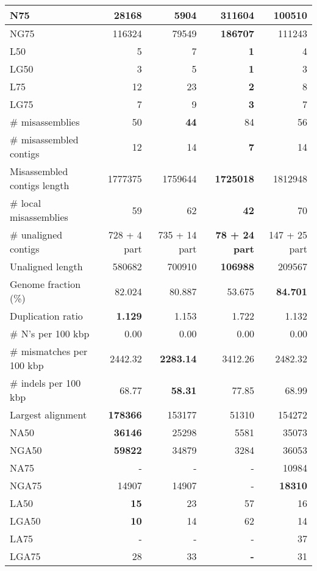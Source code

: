 \documentclass[12pt,a4paper]{article}
\begin{document}
\begin{table}[ht]
\begin{center}
\begin{tabular}{|l*{4}{|r}|}
N75 & 28168 & 5904 & {\bf 311604} & 100510 \\ \hline
NG75 & 116324 & 79549 & {\bf 186707} & 111243 \\ \hline
L50 & 5 & 7 & {\bf 1} & 4 \\ \hline
LG50 & 3 & 5 & {\bf 1} & 3 \\ \hline
L75 & 12 & 23 & {\bf 2} & 8 \\ \hline
LG75 & 7 & 9 & {\bf 3} & 7 \\ \hline
\# misassemblies & 50 & {\bf 44} & 84 & 56 \\ \hline
\# misassembled contigs & 12 & 14 & {\bf 7} & 14 \\ \hline
Misassembled contigs length & 1777375 & 1759644 & {\bf 1725018} & 1812948 \\ \hline
\# local misassemblies & 59 & 62 & {\bf 42} & 70 \\ \hline
\# unaligned contigs & 728 + 4 part & 735 + 14 part & {\bf 78 + 24 part} & 147 + 25 part \\ \hline
Unaligned length & 580682 & 700910 & {\bf 106988} & 209567 \\ \hline
Genome fraction (\%) & 82.024 & 80.887 & 53.675 & {\bf 84.701} \\ \hline
Duplication ratio & {\bf 1.129} & 1.153 & 1.722 & 1.132 \\ \hline
\# N's per 100 kbp & 0.00 & 0.00 & 0.00 & 0.00 \\ \hline
\# mismatches per 100 kbp & 2442.32 & {\bf 2283.14} & 3412.26 & 2482.32 \\ \hline
\# indels per 100 kbp & 68.77 & {\bf 58.31} & 77.85 & 68.99 \\ \hline
Largest alignment & {\bf 178366} & 153177 & 51310 & 154272 \\ \hline
NA50 & {\bf 36146} & 25298 & 5581 & 35073 \\ \hline
NGA50 & {\bf 59822} & 34879 & 3284 & 36053 \\ \hline
NA75 & - & - & - & 10984 \\ \hline
NGA75 & 14907 & 14907 & - & {\bf 18310} \\ \hline
LA50 & {\bf 15} & 23 & 57 & 16 \\ \hline
LGA50 & {\bf 10} & 14 & 62 & 14 \\ \hline
LA75 & - & - & - & 37 \\ \hline
LGA75 & 28 & 33 & {\bf -} & 31 \\ \hline
\end{tabular}
\end{center}
\end{table}
\end{document}
